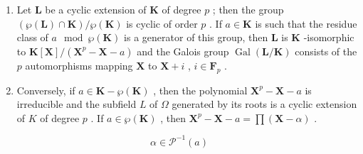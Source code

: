 \begin{enumerate}
\def\labelenumi{\arabic{enumi})}
\setcounter{enumi}{1}
\item
  Let \(\mathbf{L}\) be a cyclic extension of \(\mathbf{K}\) of degree \(p\) ; then the group \((\wp(\mathbf{L}) \cap \mathbf{K}) / \wp(\mathbf{K})\) is cyclic of order \(p\) . If \(a \in \mathbf{K}\) is such that the residue class of \(a \mod \wp(\mathbf{K})\) is a generator of this group, then \(\mathbf{L}\) is \(\mathbf{K}\) -isomorphic to \(\mathbf{K}[\mathbf{X}] / (\mathbf{X}^p - \mathbf{X} - a)\) and the Galois group \(\operatorname{Gal}(\mathbf{L} / \mathbf{K})\) consists of the \(p\) automorphisms mapping \(\mathbf{X}\) to \(\mathbf{X} + i\) , \(i \in \mathbf{F}_p\) .
\item
  Conversely, if \(a \in \mathbf{K} - \wp(\mathbf{K})\) , then the polynomial \(\mathbf{X}^p - \mathbf{X} - a\) is irreducible and the subfield \(L\) of \(\Omega\) generated by its roots is a cyclic extension of \(K\) of degree \(p\) . If \(a \in \wp(\mathbf{K})\) , then \(\mathbf{X}^p - \mathbf{X} - a = \prod (\mathbf{X} - \alpha)\) .
\end{enumerate}

\[
\alpha \in \mathcal {P} ^ {- 1} (a)
\]


